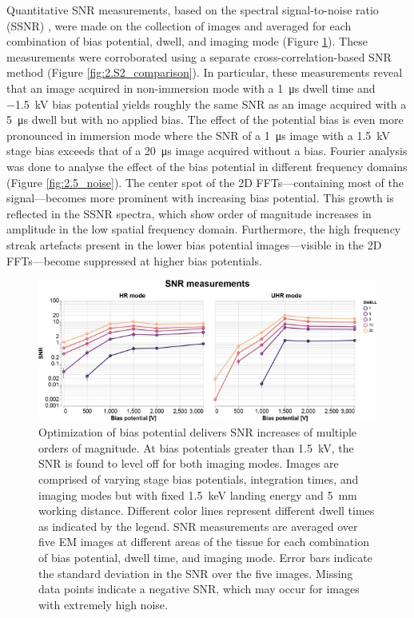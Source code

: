 Quantitative SNR measurements, based on the spectral signal-to-noise ratio (SSNR) \cite{unser1987new}, were made on the collection of images and averaged for each combination of bias potential, dwell, and imaging mode (Figure \ref{fig:2.4_snr}). These measurements were corroborated using a separate cross-correlation-based SNR method \cite{joy2002smart} (Figure \ref{fig:2.S2_comparison}). In particular, these measurements reveal that an image acquired in non-immersion mode with a \SI{1}{\micro\second} dwell time and \SI{-1.5}{\kilo\volt} bias potential yields roughly the same SNR as an image acquired with a \SI{5}{\micro\second} dwell but with no applied bias. The effect of the potential bias is even more pronounced in immersion mode where the SNR of a \SI{1}{\micro\second} image with a \SI{1.5}{\kilo\volt} stage bias exceeds that of a \SI{20}{\micro\second} image acquired without a bias. Fourier analysis was done to analyse the effect of the bias potential in different frequency domains (Figure \ref{fig:2.5_noise}). The center spot of the 2D FFTs—containing most of the signal—becomes more prominent with increasing bias potential. This growth is reflected in the SSNR spectra, which show order of magnitude increases in amplitude in the low spatial frequency domain. Furthermore, the high frequency streak artefacts present in the lower bias potential images---visible in the 2D FFTs---become suppressed at higher bias potentials.

\begin{figure}[!tb]
    \centering
    \includegraphics[width=\linewidth]{chapter-2/figures_JPEG_LQ/fig2-4_snr.jpg}
    \caption{Optimization of bias potential delivers SNR increases of multiple orders of magnitude. At bias potentials greater than \SI{1.5}{\kilo\volt}, the SNR is found to level off for both imaging modes. Images are comprised of varying stage bias potentials, integration times, and imaging modes but with fixed \SI{1.5}{\kilo\electronvolt} landing energy and \SI{5}{\milli\meter} working distance. Different color lines represent different dwell times as indicated by the legend. SNR measurements are averaged over five EM images at different areas of the tissue for each combination of bias potential, dwell time, and imaging mode. Error bars indicate the standard deviation in the SNR over the five images. Missing data points indicate a negative SNR, which may occur for images with extremely high noise.}
    \label{fig:2.4_snr}
\end{figure}


